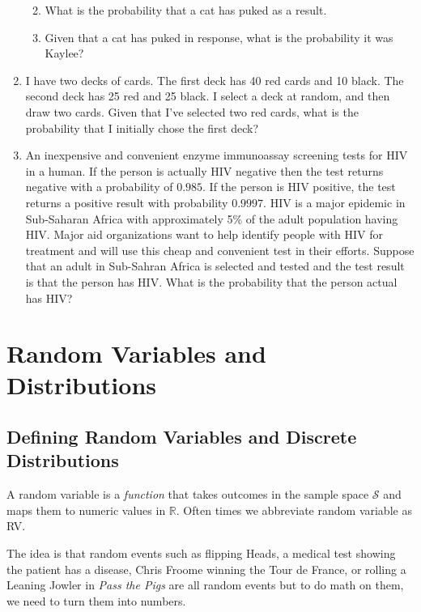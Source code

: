 \documentclass[]{book}
\providecommand{\tightlist}{%
  \setlength{\itemsep}{0pt}\setlength{\parskip}{0pt}}
\begin{document}
\begin{enumerate}
  \begin{enumerate}
  \def\labelenumii{\alph{enumii})}
  \tightlist
  \item
    What is the probability that a cat has puked as a result.
  \item
    Given that a cat has puked in response, what is the probability it
    was Kaylee?
  \end{enumerate}
\item
  I have two decks of cards. The first deck has 40 red cards and 10
  black. The second deck has 25 red and 25 black. I select a deck at
  random, and then draw two cards. Given that I've selected two red
  cards, what is the probability that I initially chose the first deck?
\item
  An inexpensive and convenient enzyme immunoassay screening tests for
  HIV in a human. If the person is actually HIV negative then the test
  returns negative with a probability of \(0.985\). If the person is HIV
  positive, the test returns a positive result with probability
  \(0.9997\). HIV is a major epidemic in Sub-Saharan Africa with
  approximately 5\% of the adult population having HIV. Major aid
  organizations want to help identify people with HIV for treatment and
  will use this cheap and convenient test in their efforts. Suppose that
  an adult in Sub-Sahran Africa is selected and tested and the test
  result is that the person has HIV. What is the probability that the
  person actual has HIV?
\end{enumerate}

\chapter{Random Variables and
Distributions}\label{random-variables-and-distributions}

\section{Defining Random Variables and Discrete
Distributions}\label{defining-random-variables-and-discrete-distributions}

A random variable is a \emph{function} that takes outcomes in the sample
space \(\mathcal{S}\) and maps them to numeric values in \(\mathbb{R}\).
Often times we abbreviate random variable as RV.

The idea is that random events such as flipping Heads, a medical test
showing the patient has a disease, Chris Froome winning the Tour de
France, or rolling a Leaning Jowler in \emph{Pass the Pigs} are all
random events but to do math on them, we need to turn them into numbers.
\end{document}

